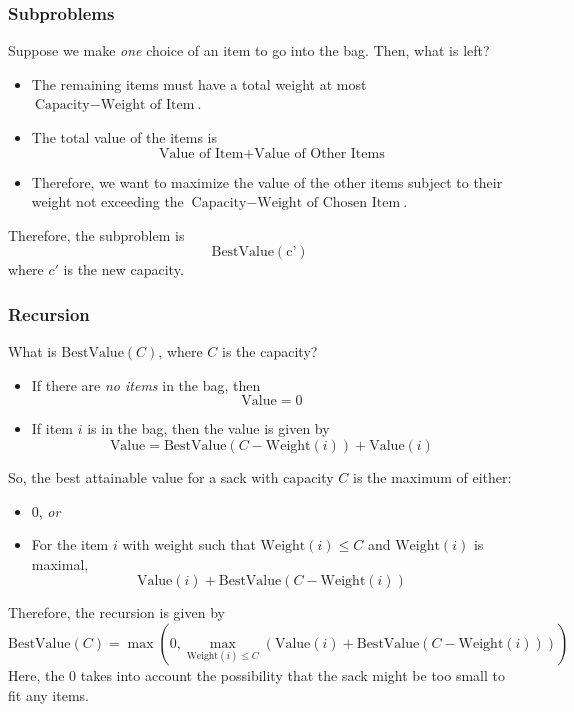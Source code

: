 \documentclass[letterpaper]{article}
\begin{document}
\subsubsection{Subproblems}
Suppose we make \emph{one} choice of an item to go into the bag. Then, what is left? 
\begin{itemize}
    \item The remaining items must have a total weight at most $\text{Capacity} - \text{Weight of Item}$. 
    \item The total value of the items is 
    \[\text{Value of Item} + \text{Value of Other Items}\]
    \item Therefore, we want to maximize the value of the other items subject to their weight not exceeding the $\text{Capacity} - \text{Weight of Chosen Item}$.
\end{itemize}
Therefore, the subproblem is 
\[\text{BestValue}(\text{c'})\]
where $c'$ is the new capacity. 

\subsubsection{Recursion}
What is $\text{BestValue}(C)$, where $C$ is the capacity?
\begin{itemize}
    \item If there are \emph{no items} in the bag, then
    \[\text{Value} = 0\]
    \item If item $i$ is in the bag, then the value is given by 
    \[\text{Value} = \text{BestValue}(C - \text{Weight}(i)) + \text{Value}(i)\]
\end{itemize}
So, the best attainable value for a sack with capacity $C$ is the maximum of either: 
\begin{itemize}
    \item 0, \emph{or}
    \item For the item $i$ with weight such that $\text{Weight}(i) \leq C$ and $\text{Weight}(i)$ is maximal,
    \[\text{Value}(i) + \text{BestValue}(C - \text{Weight}(i))\]
\end{itemize}
Therefore, the recursion is given by 
\[\text{BestValue}(C) = \max(0, \max_{\text{Weight}(i) \leq C} \left(\text{Value}(i) + \text{BestValue}(C - \text{Weight}(i))\right))\]
Here, the 0 takes into account the possibility that the sack might be too small to fit any items. 
\end{document}

